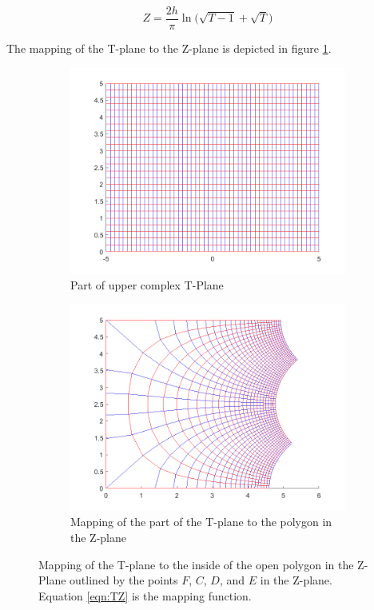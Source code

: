    \begin{equation}
     Z = \frac{2h}{\pi}\ln\Big(\sqrt{T-1} + \sqrt{T}\Big)
     \label{eqn:TZ}
 \end{equation}
 
 \noindent The mapping of the T-plane to the Z-plane is depicted in figure \ref{fig:T_to_Z_mapping}. 
 
    \begin{figure}[h]
    \centering
    \begin{subfigure}[t]{0.45\textwidth}
        \centering
        \includegraphics[width=\textwidth]{images/TtoZ_strip.png}
        \caption{Part of upper complex T-Plane}
    \end{subfigure}
    \hfill
    \begin{subfigure}[t]{0.45\textwidth}
        \centering
        \includegraphics[width=\textwidth]{images/TtoZ_map.png}
        \caption{Mapping of the part of the T-plane to the polygon in the Z-plane}
    \end{subfigure} 
    \caption[Mapping of the T-plane to the inside of the open polygon in the Z-Plane]{Mapping of the T-plane to the inside of the open polygon in the Z-Plane outlined by the points $F$, $C$, $D$, and $E$ in the Z-plane. Equation \ref{eqn:TZ} is the mapping function.} 
    \label{fig:T_to_Z_mapping}
 \end{figure}

